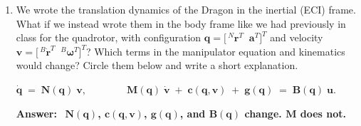 \documentclass[11pt,letterpaper]{article}
\newenvironment{answer}{\par\vspace{4pt}\color{blue!60!black}\textbf{Answer:}\ }{\par\vspace{4pt}}
\begin{document}
\begin{enumerate}[label=\textbf{\arabic*.}, leftmargin=*, itemsep=4pt]
\begin{minipage}[c]{0.55\linewidth}
\vspace{4pt}
The force is ${}^{B}\mathbf{F} = u\,{}^{B}\mathbf{d}$, and it acts at ${}^{B}\mathbf{r}$, so the torque about $O$ is ${}^{B}\boldsymbol{\tau} = {}^{B}\mathbf{r}\times{}^{B}\mathbf{F} = u\left({}^{B}\mathbf{r}\times{}^{B}\mathbf{d}\right)$.
\end{minipage}
\vspace{6pt}

\item We wrote the translation dynamics of the Dragon in the inertial (ECI) frame. What if we instead wrote them in the body frame like we had previously in class for the quadrotor, with configuration $\mathbf{q} = \bigl[\,{}^{N}\mathbf{r}^T\;\; \mathbf{a}^T\bigr]^T$ and velocity $\mathbf{v} = \bigl[\,{}^{B}\dot{\mathbf{r}}^T\;\; {}^{B}\boldsymbol{\omega}^T\bigr]^T$? Which terms in the manipulator equation and kinematics would change? Circle them below and write a short explanation.
\begin{center}
\Large
$\dot{\mathbf{q}} \;=\; \mathbf{N}(\mathbf{q})\;\mathbf{v},
\qquad\qquad
\mathbf{M}(\mathbf{q})\;\dot{\mathbf{v}} \;+\; \mathbf{c}(\mathbf{q},\mathbf{v}) \;+\; \mathbf{g}(\mathbf{q}) \;=\; \mathbf{B}(\mathbf{q})\;\mathbf{u}.$
\end{center}

\begin{answer}
\textbf{$\mathbf{N}(\mathbf{q})$, $\mathbf{c}(\mathbf{q},\mathbf{v})$, $\mathbf{g}(\mathbf{q})$, and $\mathbf{B}(\mathbf{q})$ change. $\mathbf{M}$ does not.}


\end{answer}
\end{enumerate}
\end{document}
